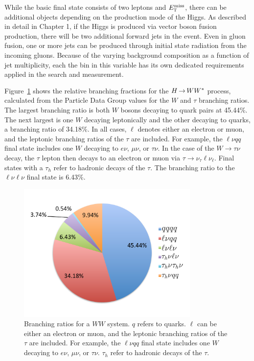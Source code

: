 While the basic final state consists of two leptons and $E_{\textrm{\footnotesize\sc t}}^{\rm miss}$, there can be additional objects depending on the production mode of the Higgs. As described in detail in Chapter 1, if the Higgs is produced via vector boson fusion production, there will be two additional forward jets in the event. Even in gluon fusion, one or more jets can be produced through initial state radiation from the incoming gluons. Because of the varying background composition as a function of jet multiplicity, each the bin in this variable has its own dedicated requirements applied in the search and measurement.

Figure~\ref{fig:WWBR} shows the relative branching fractions for the $H{\,{\rightarrow}\,}WW^\ast$ process, calculated from the Particle Data Group values for the $W$ and $\tau$ branching ratios\cite{pdg}. The largest branching ratio is both $W$ bosons decaying to quark pairs at 45.44\%. The next largest is one $W$ decaying leptonically and the other decaying to quarks, a branching ratio of 34.18\%. In all cases, $\ell$ denotes either an electron or muon, and the leptonic branching ratios of the $\tau$ are included. For example, the $\ell\nu qq$ final state includes one $W$ decaying to $e\nu$, $\mu \nu$, or $\tau \nu$. In the case of the $W\to\tau\nu$ decay, the $\tau$ lepton then decays to an electron or muon via $\tau \to \nu_\tau \ell \nu_\ell$. Final states with a $\tau_h$ refer to hadronic decays of the $\tau$. The branching ratio to the $\ell\nu\ell\nu$ final state is 6.43\%. 

\begin{figure}[h!]
  \centering
  \captionsetup{justification=centering}
  \includegraphics[width=0.8\textwidth]{figures/WWBR}
  \caption{Branching ratios for a $WW$ system. $q$ refers to quarks. $\ell$ can be either an electron or muon, and the leptonic branching ratios of the $\tau$ are included. For example, the $\ell\nu qq$ final state includes one $W$ decaying to $e\nu$, $\mu \nu$, or $\tau \nu$. $\tau_h$ refer to hadronic decays of the $\tau$.}
  \label{fig:WWBR}
\end{figure}



